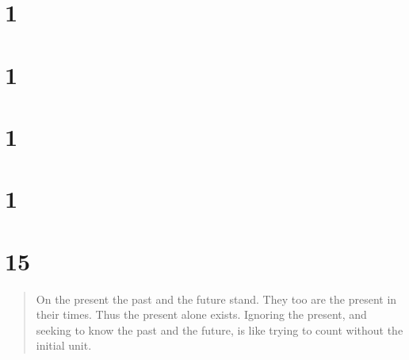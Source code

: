 \documentclass[12pt]{report}
\begin{document}
\section{1}

\begin{quote}

\end{quote}


\section{1}

\begin{quote}

\end{quote}


\section{1}

\begin{quote}

\end{quote}


\section{1}

\begin{quote}

\end{quote}




\section{15}

\begin{quote}
On the present the past and the future stand. They too are the present
in their times. Thus the present alone exists. Ignoring the present,
and seeking to know the past and the future, is like trying to count
without the initial unit.
\end{quote}
\end{document}

